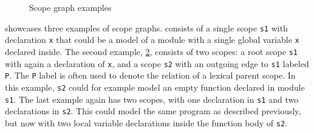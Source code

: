       \begin{figure}[h]
        \begin{subfigure}[b]{0.33\textwidth}
          \centering
          \caption{\label{fig:scope-graph-example1}}
        \end{subfigure}
        \begin{subfigure}[b]{0.33\textwidth}
          \centering
          \caption{\label{fig:scope-graph-example2}}
        \end{subfigure}
        \begin{subfigure}[b]{0.33\textwidth}
          \centering
          \caption{\label{fig:scope-graph-example3}}
        \end{subfigure}
        \caption{\label{fig:scope-graph-examples}Scope graph examples}
      \end{figure}

       showcases three examples of scope graphs.  consists of a single scope \texttt{s1} with declaration \texttt{x} that could be a model of a module with a single global variable \texttt{x} declared inside. The second example, \cref{fig:scope-graph-example2}, consists of two scopes: a root scope \texttt{s1} with again a declaration of \texttt{x}, and a scope \texttt{s2} with an outgoing edge to \texttt{s1} labeled \texttt{P}. The \texttt{P} label is often used to denote the relation of a lexical parent scope. In this example, \texttt{s2} could for example model an empty function declared in module \texttt{s1}. The last example again has two scopes, with one declaration in \texttt{s1} and two declarations in \texttt{s2}. This could model the same program as described previously, but now with two local variable declarations inside the function body of \texttt{s2}.

